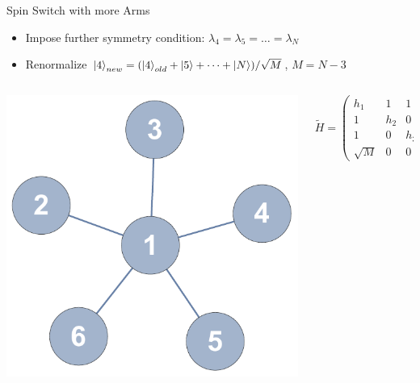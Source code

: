 \documentclass{beamer}
\begin{document}
\begin{frame}{Spin Switch with more Arms}
			\begin{itemize}
			\item Impose further symmetry condition: $\lambda_4 = \lambda_5 = \dots = \lambda_N$
			\item Renormalize $\ket{4}_{new}=(\ket{4}_{old} + \ket{5} + \dots + \ket{N})/\sqrt{M}$, $M=N-3$
			\end{itemize}
	\begin{columns}
		\begin{column}{0.5\textwidth}
   			\centering
   			\includegraphics[trim=0mm 0 0 0mm, width=1.2\textwidth]{Images/switch5_labeled}
		\end{column}
		\begin{column}{0.5\textwidth}
			\centering
    		$\tilde{H} = \begin{pmatrix}
			h_1 & 1 & 1 & \sqrt{M} \\
			1 & h_2 & 0 & 0 \\
			1 & 0 & h_3 & 0 \\
			\sqrt{M} & 0 & 0 & h_4
\end{pmatrix}$
		\end{column}
	\end{columns}
\end{frame}
\end{document}
